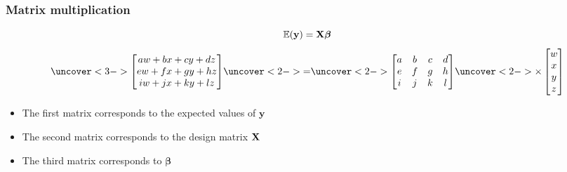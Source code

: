 \documentclass[color=usenames,dvipsnames]{beamer}\usepackage[]{graphicx}\usepackage[]{color}
\begin{document}
\begin{frame}
  \frametitle{Matrix multiplication}
  \Large
  \begin{center}
    \[
      \mathbb{E}({\bf y}) = {\bf X}{\bm \beta}
    \]
    \[
    \uncover<3->{
    \begin{bmatrix}
      aw + bx + cy + dz \\
      ew + fx + gy + hz \\
      iw + jx + ky + lz %
    \end{bmatrix}
    }
    \uncover<2->{=}
    \uncover<2->{
    \begin{bmatrix}
      a & b & c & d \\
      e & f & g & h \\
      i & j & k & l %
    \end{bmatrix}
    }
    \uncover<2->{
    \times
    \begin{bmatrix}
      w \\
      x \\
      y \\
      z
    \end{bmatrix}
    }
    \]
  \end{center}
  \normalsize
    \begin{itemize}
      \item<4-> The first matrix corresponds to the expected values of $\bm y$
      \item<4-> The second matrix corresponds to the design matrix {$\bf X$}
      \item<4-> The third matrix corresponds to {$\bm \beta$}
    \end{itemize}
\end{frame}
\end{document}
